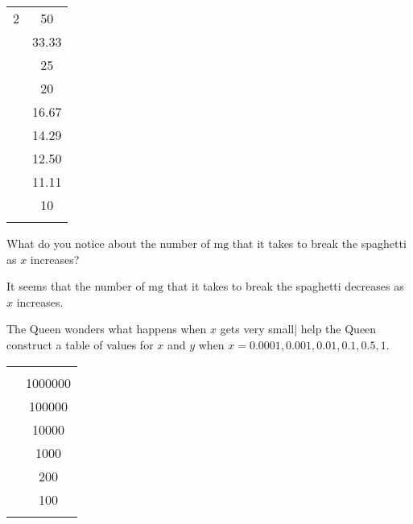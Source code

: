 \begin{problem}
\begin{subproblem}
\begin{shortsolution}
\begin{tabular}[t]{S[table-format=2]S[table-format=3.2]}
			2             & 50            \\             & 33.33         \\             & 25            \\             & 20            \\             & 16.67         \\             & 14.29         \\             & 12.50         \\             & 11.11         \\            & 10            \\\lastline     
		\end{tabular}
	\end{shortsolution}
\end{subproblem}
\begin{subproblem}
	What do you notice about the number of $\si{\milli\gram}$ that it takes to break 
	the spaghetti as $x$ increases?
	\begin{shortsolution}
		It seems that the number of $\si{\milli\gram}$ that it takes to break the spaghetti decreases
		as $x$ increases.
	\end{shortsolution}
\end{subproblem}
\begin{subproblem}\label{rat:prob:spaglt1}
	The Queen wonders what happens when $x$ gets very small| help the Queen construct 
	a table of values for $x$ and $y$ when $x=0.0001, 0.001, 0.01, 0.1, 0.5, 1$.
	\begin{shortsolution}
		\begin{tabular}[t]{S[table-format=1.4]S[table-format=7.0]}
			\beforeheading
			 &  \\        
			        & 1000000       \\         & 100000        \\          & 10000         \\           & 1000          \\           & 200           \\             & 100           \\\lastline      
		\end{tabular}
	\end{shortsolution}

\end{subproblem}
\end{problem}

